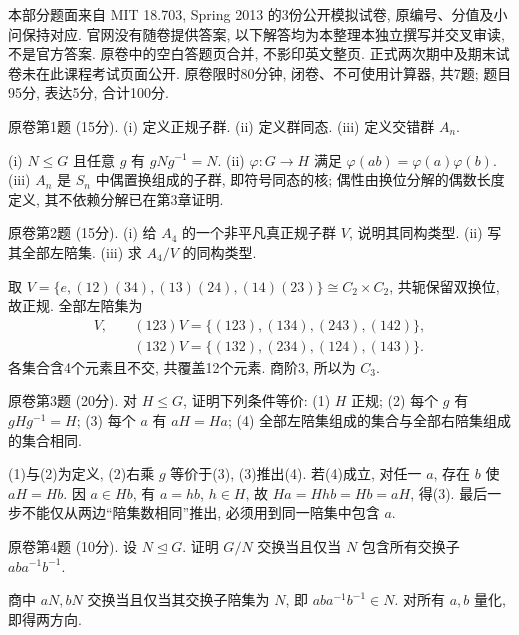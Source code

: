 本部分题面来自 MIT 18.703, Spring 2013 的3份公开模拟试卷, 原编号、分值及小问保持对应. 官网没有随卷提供答案, 以下解答均为本整理本独立撰写并交叉审读, 不是官方答案. 原卷中的空白答题页合并, 不影印英文整页. 正式两次期中及期末试卷未在此课程考试页面公开.
原卷限时80分钟, 闭卷、不可使用计算器, 共7题; 题目95分, 表达5分, 合计100分.
\begin{exercise}\label{ex:m1q1}原卷第1题 (15分). (i) 定义正规子群. (ii) 定义群同态. (iii) 定义交错群 $A_n$.\end{exercise}
\begin{solution}
(i) $N\le G$ 且任意 $g$ 有 $gNg^{-1}=N$. (ii) $\varphi:G\to H$ 满足 $\varphi(ab)=\varphi(a)\varphi(b)$. (iii) $A_n$ 是 $S_n$ 中偶置换组成的子群, 即符号同态的核; 偶性由换位分解的偶数长度定义, 其不依赖分解已在第3章证明.
\end{solution}
\begin{exercise}原卷第2题 (15分). (i) 给 $A_4$ 的一个非平凡真正规子群 $V$, 说明其同构类型. (ii) 写其全部左陪集. (iii) 求 $A_4/V$ 的同构类型.\end{exercise}
\begin{solution}
取 $V=\{e,(12)(34),(13)(24),(14)(23)\}\cong C_2\times C_2$, 共轭保留双换位, 故正规. 全部左陪集为
\begin{align*}
V,\quad &(123)V=\{(123),(134),(243),(142)\},\\
&(132)V=\{(132),(234),(124),(143)\}.
\end{align*}
各集合含4个元素且不交, 共覆盖12个元素. 商阶3, 所以为 $C_3$.
\end{solution}
\begin{exercise}原卷第3题 (20分). 对 $H\le G$, 证明下列条件等价: (1) $H$ 正规; (2) 每个 $g$ 有 $gHg^{-1}=H$; (3) 每个 $a$ 有 $aH=Ha$; (4) 全部左陪集组成的集合与全部右陪集组成的集合相同.\end{exercise}
\begin{solution}
(1)与(2)为定义, (2)右乘 $g$ 等价于(3), (3)推出(4). 若(4)成立, 对任一 $a$, 存在 $b$ 使 $aH=Hb$. 因 $a\in Hb$, 有 $a=hb$, $h\in H$, 故 $Ha=Hhb=Hb=aH$, 得(3). 最后一步不能仅从两边“陪集数相同”推出, 必须用到同一陪集中包含 $a$.
\end{solution}
\begin{exercise}原卷第4题 (10分). 设 $N\trianglelefteq G$. 证明 $G/N$ 交换当且仅当 $N$ 包含所有交换子 $aba^{-1}b^{-1}$.\end{exercise}
\begin{solution}
商中 $aN,bN$ 交换当且仅当其交换子陪集为 $N$, 即 $aba^{-1}b^{-1}\in N$. 对所有 $a,b$ 量化, 即得两方向.
\end{solution}

